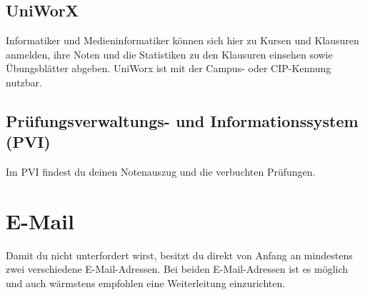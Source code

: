 \begin{urlList}
\end{urlList}

\subsection*{UniWorX\subjectList{\subjectI{}\subjectMI{}}}

Informatiker und Medieninformatiker können sich hier zu Kursen und Klausuren anmelden, ihre Noten und die Statistiken zu den Klausuren einsehen sowie Übungsblätter abgeben. UniWorx ist mit der Campus- oder CIP-Kennung nutzbar.


\begin{urlList}
\end{urlList}

\subsection*{Prüfungsverwaltungs- und Informationssystem (PVI)\subjectList{\subjectI{}\subjectMI{}}}

Im PVI findest du deinen Notenauszug und die verbuchten Prüfungen.


\begin{urlList}
\end{urlList}


\section{E-Mail}
Damit du nicht unterfordert wirst, besitzt du direkt von Anfang an mindestens zwei verschiedene E-Mail-Adressen. Bei beiden E-Mail-Adressen ist es möglich und auch wärmstens empfohlen eine Weiterleitung einzurichten.

